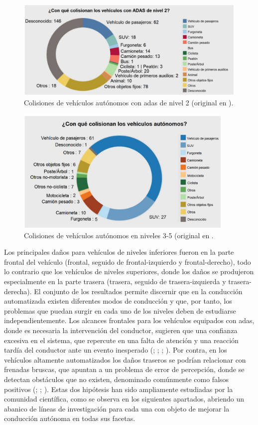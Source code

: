 \newpage
\begin{figure}[h]
  \centering
  \includegraphics[width=12.5cm]{figures/2.2.png}
  \caption{\label{fig:2.2} Colisiones de vehículos autónomos con \gls{adas} de nivel 2 (original en \textcite{nhtsa22a}).}
\end{figure}

\begin{figure}[h]
  \centering
  \includegraphics[width=10.5cm]{figures/2.3.png}
  \caption{\label{fig:2.3} Colisiones de vehículos autónomos en niveles 3-5 (original en \textcite{nhtsa22b}.}
\end{figure}

Los principales daños para vehículos de niveles inferiores fueron en la parte frontal del vehículo (frontal, seguido de frontal-izquierdo y frontal-derecho), todo lo contrario que los vehículos de niveles superiores, donde los daños se produjeron especialmente en la parte trasera (trasera, seguido de trasera-izquierda y trasera-derecha).
El conjunto de los resultados permite discernir que en la conducción automatizada existen diferentes modos de conducción y que, por tanto, los problemas que puedan surgir en cada uno de los niveles deben de estudiarse independientemente. Los alcances frontales para los vehículos equipados con \gls{adas}, donde es necesaria la intervención del conductor, sugieren que una confianza excesiva en el sistema, que repercute en una falta de atención y una reacción tardía del conductor ante un evento inesperado (\cite{cunningham}; \cite{yang21}; \cite{mcwilliams}; \cite{hsieh}). Por contra, en los vehículos altamente automatizados los daños traseros se podrían relacionar con frenadas bruscas, que apuntan a un problema de error de percepción, donde se detectan obstáculos que no existen, denominado comúnmente como falsos positivos (\cite{bellosalau}; \cite{buhler}; \cite{zhang22}). Estas dos hipótesis han sido ampliamente estudiadas por la comunidad científica, como se observa en los siguientes apartados, abriendo un abanico de líneas de investigación para cada una con objeto de mejorar la conducción autónoma en todas sus facetas.

